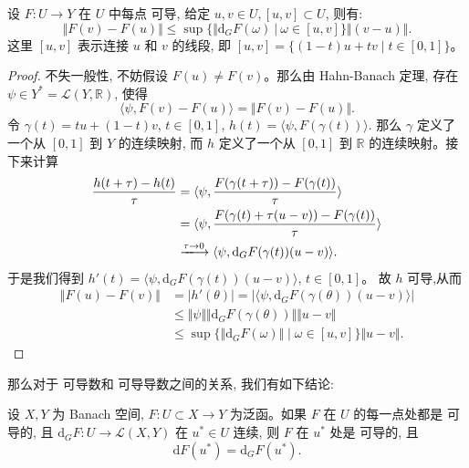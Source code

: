 \documentclass[11pt]{ctexart}
\begin{document}
\begin{theorem}\label{mean-value}
  设 $F: U \to Y$ 在 $U$ 中每点 \Gateaux 可导, 给定 $u,v \in U, [u,v] \subset U$, 则有:
  \begin{equation}
    \Vert F(v) - F(u) \Vert \leq \sup\{ \Vert \mathrm{d}_{G}F(\omega)\  |\ \omega \in [u,v] \} \Vert (v-u) \Vert.
  \end{equation}
  这里 $[u,v]$ 表示连接 $u$ 和 $v$ 的线段, 即 $[u,v] = \{ (1-t)u + tv \mid t \in [0,1] \}$。
\end{theorem}
\begin{proof}
  不失一般性, 不妨假设 $F(u) \neq F(v)$。那么由 Hahn-Banach 定理, 存在 $\psi \in Y^{*} = \mathscr{L}(Y,\mathbb{R})$, 使得
  \begin{equation*}
    \langle \psi, F(v) - F(u) \rangle = \Vert F(v) - F(u) \Vert.
  \end{equation*}
  令 $\gamma(t) = tu+(1-t)v$, $t \in [0,1]$, $h(t) = \langle \psi, F(\gamma(t)) \rangle$. 那么
  $\gamma$ 定义了一个从 $[0,1]$ 到 $Y$ 的连续映射, 而 $h$ 定义了一个从 $[0,1]$ 到 $\mathbb{R}$ 的连续映射。接下来计算
  \begin{equation*}
    \begin{aligned}
      \frac{h(t+\tau)-h(t)}{\tau} &= \langle \psi, \frac{F(\gamma(t+\tau)) - F(\gamma(t))}{\tau} \rangle\\
      &= \langle \psi, \frac{F(\gamma(t)+\tau(u-v))-F(\gamma(t))}{\tau} \rangle\\
      &\xlongrightarrow{\tau \to 0} \langle \psi, \mathrm{d}_{G}F(\gamma(t))(u-v) \rangle.
    \end{aligned}
  \end{equation*}
  于是我们得到 $h'(t) = \langle \psi, \mathrm{d}_{G}F(\gamma(t))(u-v) \rangle$, $t \in [0,1]$。 故 $h$ 可导,从而
  \begin{equation*}
    \begin{aligned}
      \Vert F(u)-F(v) \Vert &= |h'(\theta)| = |\langle \psi, \mathrm{d}_{G}F(\gamma(\theta))(u-v) \rangle|\\
      &\leq \Vert \psi \Vert \Vert \mathrm{d}_{G}F(\gamma(\theta)) \Vert \Vert u-v \Vert\\
      &\leq \sup\{ \Vert \mathrm{d}_{G}F(\omega) \Vert \mid \omega \in [u,v] \} \Vert u-v \Vert.
    \end{aligned}
  \end{equation*}
\end{proof}
那么对于 \Gateaux 可导数和 \Frechet 可导导数之间的关系, 我们有如下结论:
\begin{theorem}
  设 $X, Y$ 为 Banach 空间, $F: U \subset X \to Y$ 为泛函。如果 $F$ 在 $U$ 的每一点处都是 \Gateaux 可导的, 且 $\mathrm{d}_{G}F : U \to \mathscr{L}(X,Y)$
  在 $u^{*}\in U$ 连续, 则 $F$ 在 $u^{*}$ 处是 \Frechet 可导的, 且
  \begin{equation*}
    \mathrm{d}F(u^{*}) = \mathrm{d}_{G}F(u^{*}).
  \end{equation*}
\end{theorem}
\end{document}
